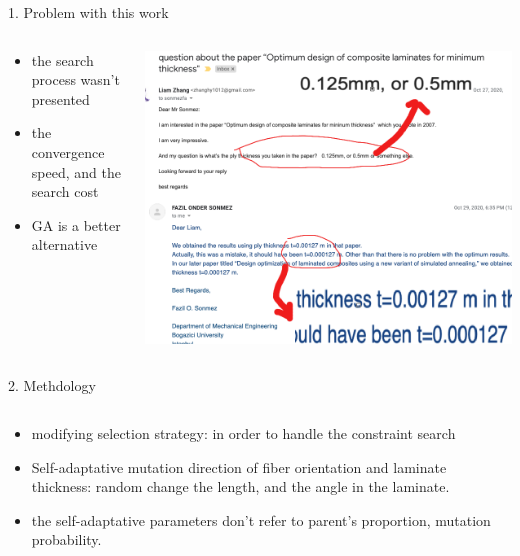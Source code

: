 \documentclass{beamer}
\begin{document}
\begin{frame}{1. Problem with this work}
\begin{columns}[c]
    \begin{column}{0.4\textwidth}
        \begin{itemize}
			\item the search process wasn't presented
			\item the convergence speed, and the search cost
			\item GA is a better alternative
        \end{itemize}
    \end{column}

    \begin{column}{0.6\textwidth}
        \begin{center}
            \includegraphics[width=1.0\linewidth]{2020-11-10-pre-image/email.png}
        \end{center}
    \end{column}
\end{columns}


\end{frame}
\begin{frame}{2. Methdology}
    \begin{columns}[c]
    \begin{column}{1\textwidth}
		\begin{itemize}
			\item modifying selection strategy: in order to handle the constraint search
			\item Self-adaptative mutation direction of fiber orientation and laminate thickness:
				random change the length, and the angle in the laminate.
			\item the self-adaptative parameters don't refer to parent's proportion, mutation
				probability.
		\end{itemize}
    \end{column}
    \begin{column}{0.8\textwidth}

    \end{column}

\end{columns}


\end{frame}
\end{document}
